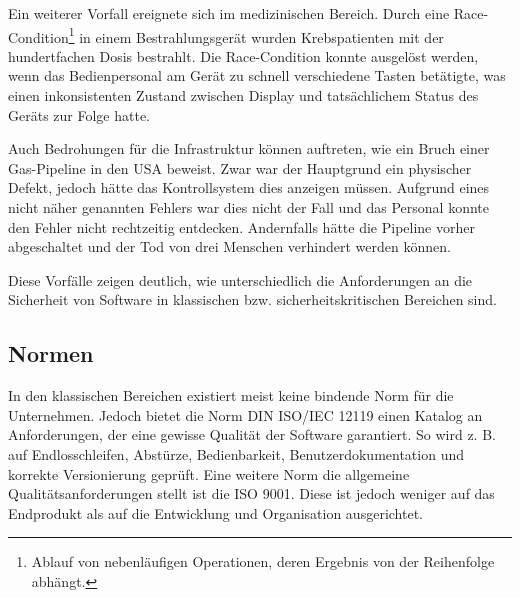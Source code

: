 Ein weiterer Vorfall ereignete sich im medizinischen Bereich.
Durch eine Race-Condition\footnote{Ablauf von nebenläufigen Operationen, deren Ergebnis von der Reihenfolge abhängt.} in einem Bestrahlungsgerät wurden Krebspatienten mit der hundertfachen Dosis bestrahlt.
Die Race-Condition konnte ausgelöst werden, wenn das Bedienpersonal am Gerät zu schnell verschiedene Tasten betätigte, was einen inkonsistenten Zustand zwischen Display und tatsächlichem Status des Geräts zur Folge hatte.

Auch Bedrohungen für die Infrastruktur können auftreten, wie ein Bruch einer Gas-Pipeline in den USA beweist.
Zwar war der Hauptgrund ein physischer Defekt, jedoch hätte das Kontrollsystem dies anzeigen müssen.
Aufgrund eines nicht näher genannten Fehlers war dies nicht der Fall und das Personal konnte den Fehler nicht rechtzeitig entdecken.
Andernfalls hätte die Pipeline vorher abgeschaltet und der Tod von drei Menschen verhindert werden können.

Diese Vorfälle zeigen deutlich, wie unterschiedlich die Anforderungen an die Sicherheit von Software in klassischen bzw. sicherheitskritischen Bereichen sind.

\subsection{Normen} %

In den klassischen Bereichen existiert meist keine bindende Norm für die Unternehmen.
Jedoch bietet die Norm DIN ISO/IEC 12119 einen Katalog an Anforderungen, der eine gewisse Qualität der Software garantiert.
So wird z. B. auf Endlosschleifen, Abstürze, Bedienbarkeit, Benutzerdokumentation und korrekte Versionierung geprüft. 
Eine weitere Norm die allgemeine Qualitätsanforderungen stellt ist die ISO 9001.
Diese ist jedoch weniger auf das Endprodukt als auf die Entwicklung und Organisation ausgerichtet.
\parencite[Vgl.][S. 66 - 67]{Hohler:1998aa}


